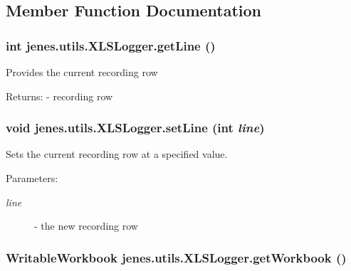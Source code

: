 \subsection{Member Function Documentation}
\hypertarget{classjenes_1_1utils_1_1_x_l_s_logger_60e8ee28d3d3305e085726026e09cfdc}{
\subsubsection[getLine]{\setlength{\rightskip}{0pt plus 5cm}int jenes.utils.XLSLogger.getLine ()}}
\label{classjenes_1_1utils_1_1_x_l_s_logger_60e8ee28d3d3305e085726026e09cfdc}


Provides the current recording row

\begin{Desc}
\item[Returns:]- recording row \end{Desc}
\hypertarget{classjenes_1_1utils_1_1_x_l_s_logger_2f9ce5372263fadce99a863149f3cb55}{
\subsubsection[setLine]{\setlength{\rightskip}{0pt plus 5cm}void jenes.utils.XLSLogger.setLine (int {\em line})}}
\label{classjenes_1_1utils_1_1_x_l_s_logger_2f9ce5372263fadce99a863149f3cb55}


Sets the current recording row at a specified value.

\begin{Desc}
\item[Parameters:]
\begin{description}
\item[{\em line}]- the new recording row \end{description}
\end{Desc}
\hypertarget{classjenes_1_1utils_1_1_x_l_s_logger_b84e4c5e6518902f710cd3c3cc337f3d}{
\subsubsection[getWorkbook]{\setlength{\rightskip}{0pt plus 5cm}WritableWorkbook jenes.utils.XLSLogger.getWorkbook ()}}
\label{classjenes_1_1utils_1_1_x_l_s_logger_b84e4c5e6518902f710cd3c3cc337f3d}


